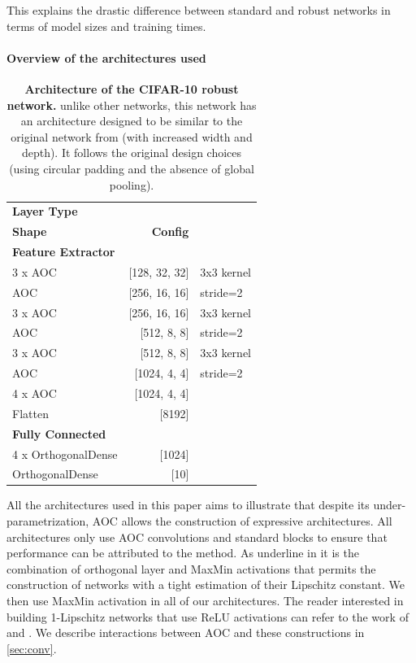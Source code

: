 This explains the drastic difference between standard and robust networks in terms of model sizes and training times. 
\paragraph{Overview of the architectures used}

    \begin{table}%
        \centering
        \begin{tabular}{lrl}
            \hline
            \textbf{Layer Type} & \makecell{\textbf{Output}\\\textbf{Shape}} & \textbf{Config} \\
            \hline
            \textbf{Feature Extractor} & & \\ 
            3 x AOC            & [128, 32, 32]  & 3x3 kernel \\
            AOC                & [256, 16, 16]  &  stride=2 \\
            3 x AOC            & [256, 16, 16]  & 3x3 kernel \\
            AOC                & [512, 8, 8]    &  stride=2 \\
            3 x AOC            & [512, 8, 8]    & 3x3 kernel \\
            AOC                & [1024, 4, 4]   &  stride=2 \\
            4 x AOC            & [1024, 4, 4]   & \\
            Flatten            & [8192]         & \\
            \hline
            \textbf{Fully Connected} & & \\
            4 x OrthogonalDense & [1024] & \\
            OrthogonalDense     & [10]   & \\
            \hline
        \end{tabular}
        \caption{\textbf{Architecture of the CIFAR-10 robust network.} unlike other networks, this network has an architecture designed to be similar to the original network from \cite{li_preventing_2019} (with increased width and depth). It follows the original design choices (using circular padding and the absence of global pooling).}
        \label{tab:cifar10_architecture_robust}
     \end{table}

    All the architectures used in this paper aims to illustrate that despite its under-parametrization, AOC allows the construction of expressive architectures. All architectures only use AOC convolutions and standard blocks to ensure that performance can be attributed to the method. As underline in \cite{anil_sorting_2019} it is the combination of orthogonal layer and MaxMin activations that permits the construction of networks with a tight estimation of their Lipschitz constant. We then use MaxMin activation in all of our architectures. The reader interested in building 1-Lipschitz networks that use ReLU activations can refer to the work of \cite{araujo_unified_2023} and \cite{wang_direct_2023}. We describe interactions between AOC and these constructions in \cref{sec:conv}.

